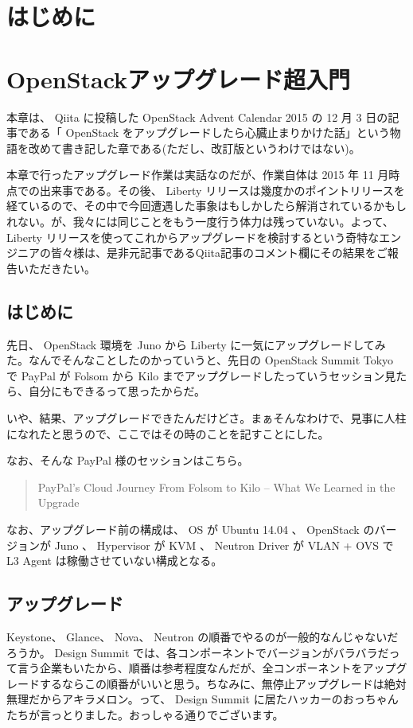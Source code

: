 \documentclass[9pt,b5paper,tombo,openany]{jsbook}
\begin{document}
\tableofcontents

\chapter{はじめに}

\setcounter{page}{1}

\chapter{OpenStackアップグレード超入門}
本章は、 Qiita に投稿した OpenStack Advent Calendar 2015 の 12 月 3 日の記事である「 OpenStack をアップグレードしたら心臓止まりかけた話」という物語を改めて書き記した章である(ただし、改訂版というわけではない)。

本章で行ったアップグレード作業は実話なのだが、作業自体は 2015 年 11 月時点での出来事である。その後、 Liberty リリースは幾度かのポイントリリースを経ているので、その中で今回遭遇した事象はもしかしたら解消されているかもしれない。が、我々には同じことをもう一度行う体力は残っていない。よって、 Liberty リリースを使ってこれからアップグレードを検討するという奇特なエンジニアの皆々様は、是非元記事であるQiita記事のコメント欄にその結果をご報告いただきたい。

\section{はじめに}
先日、 OpenStack 環境を Juno から Liberty に一気にアップグレードしてみた。なんでそんなことしたのかっていうと、先日の OpenStack Summit Tokyo で PayPal が Folsom から Kilo までアップグレードしたっていうセッション見たら、自分にもできるって思ったからだ。

いや、結果、アップグレードできたんだけどさ。まぁそんなわけで、見事に人柱になれたと思うので、ここではその時のことを記すことにした。

\noindent
なお、そんな PayPal 様のセッションはこちら。

\begin{quote}
PayPal's Cloud Journey From Folsom to Kilo -- What We Learned in the Upgrade
\end{quote}

なお、アップグレード前の構成は、 OS が Ubuntu 14.04 、 OpenStack のバージョンが Juno 、 Hypervisor が KVM 、 Neutron Driver が VLAN + OVS で L3 Agent は稼働させていない構成となる。

\section{アップグレード}
Keystone、 Glance、 Nova、 Neutron の順番でやるのが一般的なんじゃないだろうか。 Design Summit では、各コンポーネントでバージョンがバラバラだって言う企業もいたから、順番は参考程度なんだが、全コンポーネントをアップグレードするならこの順番がいいと思う。ちなみに、無停止アップグレードは絶対無理だからアキラメロン。って、 Design Summit に居たハッカーのおっちゃんたちが言っとりました。おっしゃる通りでございます。
\end{document}
